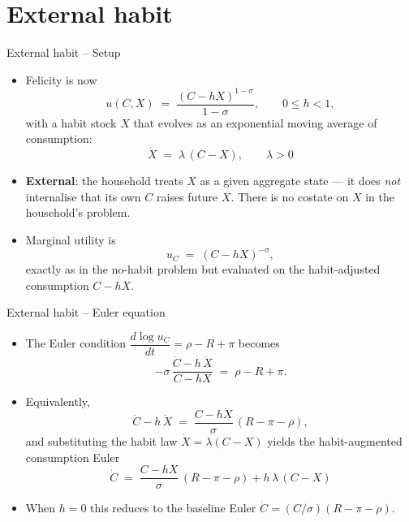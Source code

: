 \documentclass[11pt,aspectratio=169]{beamer}
\begin{document}
\section{External habit}

\begin{frame}{External habit -- Setup}

\begin{itemize}

\item Felicity is now
  \[
  u(C, X) \;=\; \frac{(C - h X)^{1-\sigma}}{1-\sigma},
  \qquad 0 \le h < 1,
  \]
  with a habit stock $X$ that evolves as an exponential moving average
  of consumption:
  \[
  \boxed{\dot X \;=\; \lambda\,(C - X), \qquad \lambda > 0}
  \]

\item \textbf{External}: the household treats $X$ as a given aggregate
  state — it does \emph{not} internalise that its own $C$ raises future
  $X$. There is no costate on $X$ in the household's problem.\newline

\item Marginal utility is
  \[
  u_C \;=\; (C - h X)^{-\sigma},
  \]
  exactly as in the no-habit problem but evaluated on the
  habit-adjusted consumption $C - h X$.

\end{itemize}

\end{frame}

\begin{frame}{External habit -- Euler equation}

\begin{itemize}

\item The Euler condition $\dfrac{d\log u_C}{dt} = \rho - R + \pi$ becomes
  \[
  -\sigma\,\frac{\dot C - h\,\dot X}{C - hX} \;=\; \rho - R + \pi.
  \]

\item Equivalently,
  \[
  \dot C - h\,\dot X \;=\; \frac{C - hX}{\sigma}\,(R - \pi - \rho),
  \]
  and substituting the habit law $\dot X = \lambda(C-X)$ yields the
  habit-augmented consumption Euler
  \[
  \boxed{\dot C \;=\; \frac{C - hX}{\sigma}\,(R - \pi - \rho)
  + h\,\lambda\,(C - X)}
  \]

\item When $h=0$ this reduces to the baseline Euler $\dot C =
  (C/\sigma)(R-\pi-\rho)$.

\end{itemize}

\end{frame}
\end{document}
